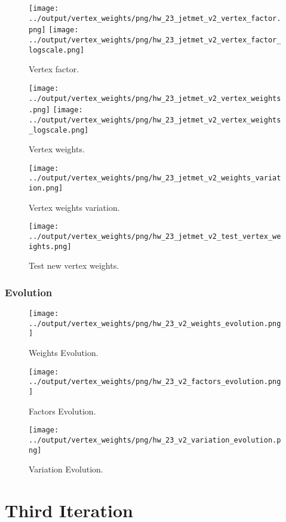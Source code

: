 \documentclass[11pt]{book}
\begin{document}
\begin{figure}[ht]
\centering
\texttt{[image: ../output/vertex\_weights/png/hw\_23\_jetmet\_v2\_vertex\_factor.png]}
\texttt{[image: ../output/vertex\_weights/png/hw\_23\_jetmet\_v2\_vertex\_factor\_logscale.png]}
\caption{Vertex factor.}
\end{figure}

\begin{figure}[ht]
\centering
\texttt{[image: ../output/vertex\_weights/png/hw\_23\_jetmet\_v2\_vertex\_weights.png]}
\texttt{[image: ../output/vertex\_weights/png/hw\_23\_jetmet\_v2\_vertex\_weights\_logscale.png]}
\caption{Vertex weights.}
\end{figure}

\begin{figure}[ht]
\centering
\texttt{[image: ../output/vertex\_weights/png/hw\_23\_jetmet\_v2\_weights\_variation.png]}
\caption{Vertex weights variation.}
\end{figure}

\begin{figure}[ht]
\centering
\texttt{[image: ../output/vertex\_weights/png/hw\_23\_jetmet\_v2\_test\_vertex\_weights.png]}
\caption{Test new vertex weights.}
\end{figure}
\clearpage

\subsection{Evolution}
\begin{figure}[ht]
\centering
\texttt{[image: ../output/vertex\_weights/png/hw\_23\_v2\_weights\_evolution.png]}
\caption{Weights Evolution.}
\end{figure}


\begin{figure}[ht]
\centering
\texttt{[image: ../output/vertex\_weights/png/hw\_23\_v2\_factors\_evolution.png]}
\caption{Factors Evolution.}
\end{figure}

\begin{figure}[ht]
\centering
\texttt{[image: ../output/vertex\_weights/png/hw\_23\_v2\_variation\_evolution.png]}
\caption{Variation Evolution.}
\end{figure}
\clearpage


\chapter{Third Iteration}
\end{document}
